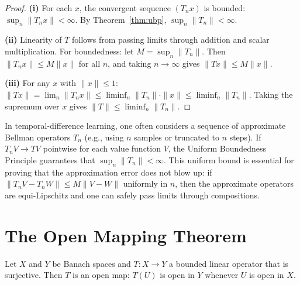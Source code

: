 \documentclass[11pt,a4paper]{article}
\begin{document}
\begin{proof}
\textbf{(i)} For each $x$, the convergent sequence $(T_n x)$ is bounded:
$\sup_n \|T_n x\| < \infty$. By Theorem~\ref{thm:ubp},
$\sup_n \|T_n\| < \infty$.

\textbf{(ii)} Linearity of $T$ follows from passing limits through
addition and scalar multiplication. For boundedness: let
$M = \sup_n \|T_n\|$. Then $\|T_n x\| \leq M \|x\|$ for all $n$, and
taking $n \to \infty$ gives $\|Tx\| \leq M \|x\|$.

\textbf{(iii)} For any $x$ with $\|x\| \leq 1$:
$\|Tx\| = \lim_n \|T_n x\| \leq \liminf_n \|T_n\| \cdot \|x\|
\leq \liminf_n \|T_n\|$. Taking the supremum over $x$ gives
$\|T\| \leq \liminf_n \|T_n\|$.
\end{proof}

\begin{rlconnection}[title={Uniform Boundedness in Value Function Approximation}]
In temporal-difference learning, one often considers a sequence of
approximate Bellman operators $T_n$ (e.g., using $n$ samples or
truncated to $n$ steps). If $T_n V \to TV$ pointwise for each value
function $V$, the Uniform Boundedness Principle guarantees that
$\sup_n \|T_n\| < \infty$. This uniform bound is essential for proving
that the approximation error does not blow up: if
$\|T_n V - T_n W\| \leq M \|V - W\|$ uniformly in $n$, then the
approximate operators are equi-Lipschitz and one can safely pass limits
through compositions.
\end{rlconnection}


\section{The Open Mapping Theorem}
\label{sec:open-mapping}

\begin{theorem}
\label{thm:open-mapping}
Let $X$ and $Y$ be Banach spaces and $T \colon X \to Y$ a bounded
linear operator that is surjective. Then $T$ is an open map: $T(U)$ is
open in $Y$ whenever $U$ is open in $X$.
\end{theorem}
\end{document}
